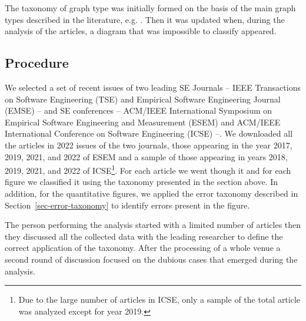 \documentclass[
  10pt,
  conference,
]{IEEEtran}%
\begin{document}
\begin{table}

\caption{\label{tbl-types}Types of figures}


\end{table}%

The taxonomy of graph type was initially formed on the basis of the main
graph types described in the literature, e.g.
. Then it was updated when, during the
analysis of the articles, a diagram that was impossible to classify
appeared.

\subsection{Procedure}\label{procedure}

We selected a set of recent issues of two leading SE Journals -- IEEE
Transactions on Software Engineering (TSE) and Empirical Software
Engineering Journal (EMSE) -- and SE conferences -- ACM/IEEE
International Symposium on Empirical Software Engineering and
Measurement (ESEM) and ACM/IEEE International Conference on Software
Engineering (ICSE) --. We downloaded all the articles in 2022 issues of
the two journals, those appearing in the year 2017, 2019, 2021, and 2022
of ESEM and a sample of those appearing in years 2018, 2019, 2021, and
2022 of ICSE\footnote{Due to the large number of articles in ICSE, only
  a sample of the total article was analyzed except for year 2019.}. For
each article we went though it and for each figure we classified it
using the taxonomy presented in the section above. In addition, for the
quantitative figures, we applied the error taxonomy described in
Section~\ref{sec-error-taxonomy} to identify errors present in the
figure.

The person performing the analysis started with a limited number of
articles then they discussed all the collected data with the leading
researcher to define the correct application of the taxonomy. After the
processing of a whole venue a second round of discussion focused on the
dubious cases that emerged during the analysis.
\end{document}
